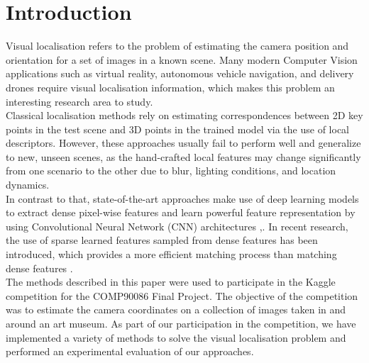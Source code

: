 \documentclass[conference]{IEEEtran}
\begin{document}
\section{Introduction}
Visual localisation refers to the problem of estimating the camera position and orientation for a set of images in a known scene. Many modern Computer Vision applications such as virtual reality, autonomous vehicle navigation, and delivery drones require visual localisation information, which  makes this problem an interesting research area to study. \\
Classical localisation methods rely on estimating correspondences between 2D key points in the test scene and 3D points in the trained model via the use of local descriptors. However, these approaches usually fail to perform well and generalize to new, unseen scenes, as the hand-crafted local features may change significantly from one scenario to the other due to blur, lighting conditions, and location dynamics. \\
In contrast to that, state-of-the-art approaches make use of deep learning models to extract dense pixel-wise features and learn powerful feature representation by using Convolutional Neural Network (CNN) architectures \cite{b1},\cite{ b2}. In recent research, the use of sparse learned features sampled from dense features has been introduced, which provides a more efficient matching process than matching dense features \cite{b3}.\\
The methods described in this paper were used to participate in the Kaggle competition for the COMP90086 Final Project. The objective of the competition was to estimate the camera coordinates on a collection of images taken in and around an art museum. As part of our participation in the competition, we have implemented a variety of methods to solve the visual localisation problem and performed an experimental evaluation of our approaches.
\end{document}
